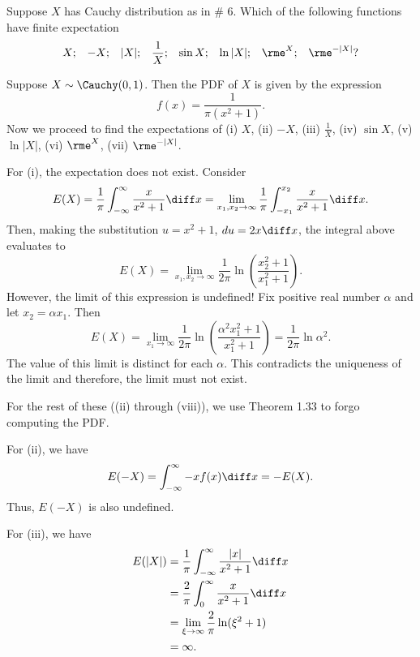 \begin{problem}[Handout 13, \# 10]
  Suppose \(X\) has Cauchy distribution as in \# 6. Which of the following
  functions have finite expectation
  \[
    \begin{aligned}
      X;&&-X;&&|X|;&&\frac{1}{X};&&\sin X;&&\ln|X|;&&\rme^X;&&\rme^{-|X|}?
    \end{aligned}
  \]
\end{problem}
\begin{solution}
  Suppose \(X\sim\Cauchy(0,1)\). Then the PDF of \(X\) is given by the
  expression
  \[
    f(x)=\frac{1}{\pi(x^2+1)}.
  \]
  Now we proceed to find the expectations of (i) \(X\), (ii) \(-X\),
  (iii) \(\frac{1}{X}\), (iv) \(\sin X\), (v) \(\ln|X|\), (vi) \(\rme^X\),
  (vii) \(\rme^{{-}|X|}\).

  For (i), the expectation does not exist. Consider
  \[
    E(X)
    =\frac{1}{\pi}\int_{-\infty}^\infty \frac{x}{x^2+1}\diff x
    =\lim_{x_1,x_2\to\infty}\frac{1}{\pi}\int_{-x_1}^{x_2}\frac{x}{x^2+1}\diff x.
  \]
  Then, making the substitution \(u=x^2+1\), \(du=2x\diff x\), the integral
  above evaluates to
  \[
    E(X)=\lim_{x_1,x_2\to\infty}\frac{1}{2\pi}\ln\left(\frac{x_2^2+1}{x_1^2+1}\right).
  \]
  However, the limit of this expression is undefined! Fix positive real
  number \(\alpha\) and let \(x_2=\alpha x_1\). Then
  \[
    E(X)=%
    \lim_{x_1\to\infty}\frac{1}{2\pi}\ln\left(\frac{\alpha^2x_1^2+1}{x_1^2+1}\right)=%
    \frac{1}{2\pi}\ln\alpha^2.
  \]
  The value of this limit is distinct for each \(\alpha\). This contradicts
  the uniqueness of the limit and therefore, the limit must not exist.

  For the rest of these ((ii) through (viii)), we
  use Theorem 1.33 to forgo computing the PDF.

  For (ii), we have
  \[
    E(-X)=\int_{-\infty}^\infty -xf(x)\diff x=-E(X).
  \]
  Thus, \(E(-X)\) is also undefined.

  For (iii), we have
  \begin{align*}
    E(|X|)
    &=\frac{1}{\pi}\int_{-\infty}^\infty\frac{|x|}{x^2+1}\diff x\\
    &=\frac{2}{\pi}\int_0^\infty\frac{x}{x^2+1}\diff x\\
    &=\lim_{\xi\to\infty}\frac{2}{\pi}\ln(\xi^2+1)\\
    &=\infty.
  \end{align*}


\end{solution}
